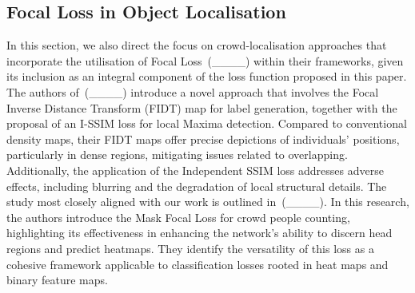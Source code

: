 \subsection{Focal Loss in Object Localisation}
In this section, we also direct the focus on crowd-localisation approaches that incorporate the utilisation of Focal Loss~(____) within their frameworks, given its inclusion as an integral component of the loss function proposed in this paper. The authors of~(____) introduce a novel approach that involves the Focal Inverse Distance Transform (FIDT) map for label generation, together with the proposal of an I-SSIM loss for local Maxima detection. Compared to conventional density maps, their FIDT maps offer precise depictions of individuals' positions, particularly in dense regions, mitigating issues related to overlapping. Additionally, the application of the Independent SSIM loss addresses adverse effects, including blurring and the degradation of local structural details. The study most closely aligned with our work is outlined in~(____). In this research, the authors introduce the Mask Focal Loss for crowd people counting, highlighting its effectiveness in enhancing the network's ability to discern head regions and predict heatmaps. They identify the versatility of this loss as a cohesive framework applicable to classification losses rooted in heat maps and binary feature maps.